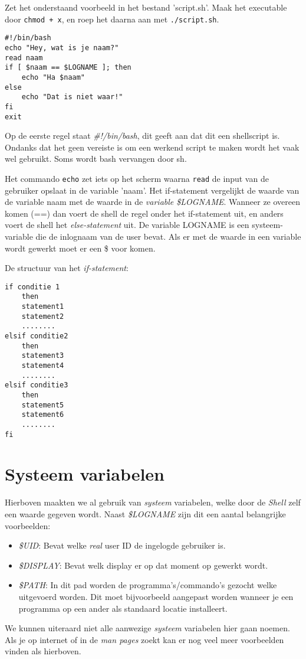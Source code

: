Zet het onderstaand voorbeeld in het bestand 'script.sh'. Maak het executable door \texttt{chmod + x}, en roep het daarna aan met \texttt{./script.sh}.

\begin{lstlisting}
#!/bin/bash
echo "Hey, wat is je naam?"
read naam
if [ $naam == $LOGNAME ]; then
    echo "Ha $naam"
else
    echo "Dat is niet waar!"
fi
exit
\end{lstlisting}%
Op de eerste regel staat \emph{\#!/bin/bash}, dit geeft aan dat dit een shellscript is. Ondanks dat het geen vereiste is om een werkend script te maken wordt het vaak wel gebruikt. Soms wordt bash vervangen door sh.

Het commando \texttt{echo} zet iets op het scherm waarna \texttt{read} de input van de gebruiker opslaat in de variable 'naam'. Het if-statement vergelijkt de waarde van de variable naam met de waarde in de \emph{variable \$LOGNAME}. Wanneer ze overeen komen (==) dan voert de shell de regel onder het if-statement uit, en anders voert de shell het \emph{else-statement} uit. De variable LOGNAME is een systeem-variable die de inlognaam van de user bevat. Als er met de waarde in een variable wordt gewerkt moet er een \$ voor komen.

De structuur van het \emph{if-statement}:
\begin{lstlisting}
if conditie 1
    then
    statement1
    statement2
    ........
elsif conditie2
    then
    statement3
    statement4
    ........
elsif conditie3
    then
    statement5
    statement6
    ........
fi
\end{lstlisting}

\section{Systeem variabelen}
Hierboven maakten we al gebruik van \emph{systeem} variabelen, welke door de \emph{Shell} zelf een waarde gegeven wordt. Naast \emph{\$LOGNAME} zijn dit een aantal belangrijke voorbeelden:
\begin{itemize}
\item \emph{\$UID}: Bevat welke \emph{real} user ID de ingelogde gebruiker is.
\item \emph{\$DISPLAY}: Bevat welk display er op dat moment op gewerkt wordt.
\item \emph{\$PATH}: In dit pad worden de programma's/commando's gezocht welke uitgevoerd worden. Dit moet bijvoorbeeld aangepast worden wanneer je een programma op een ander als standaard locatie installeert.
\end{itemize}
We kunnen uiteraard niet alle aanwezige \emph{systeem} variabelen hier gaan noemen. Als je op internet of in de \emph{man pages} zoekt kan er nog veel meer voorbeelden vinden als hierboven.

